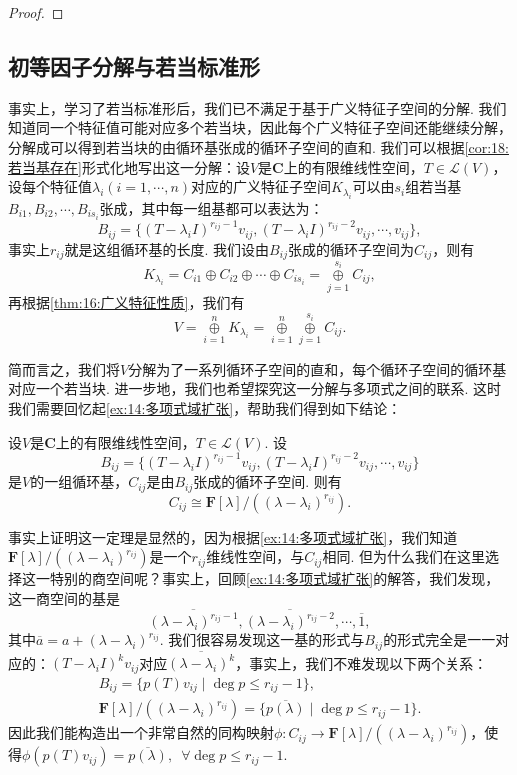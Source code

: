 \begin{proof}

\end{proof}

\subsection{初等因子分解与若当标准形}
事实上，学习了若当标准形后，我们已不满足于基于广义特征子空间的分解. 我们知道同一个特征值可能对应多个若当块，因此每个广义特征子空间还能继续分解，分解成可以得到若当块的由循环基张成的循环子空间的直和. 我们可以根据\autoref{cor:18:若当基存在}形式化地写出这一分解：设$V$是$\mathbf{C}$上的有限维线性空间，$T\in\mathcal{L}(V)$，设每个特征值$\lambda_i(i=1,\cdots,n)$对应的广义特征子空间$K_{\lambda_i}$可以由$s_i$组若当基$B_{i1},B_{i2},\cdots,B_{is_i}$张成，其中每一组基都可以表达为：
\[B_{ij}=\{(T-\lambda_iI)^{r_{ij}-1}v_{ij},(T-\lambda_iI)^{r_{ij}-2}v_{ij},\cdots,v_{ij}\},\]
事实上$r_{ij}$就是这组循环基的长度. 我们设由$B_{ij}$张成的循环子空间为$C_{ij}$，则有
\[K_{\lambda_i}=C_{i1}\oplus C_{i2}\oplus\cdots\oplus C_{is_i}=\mathop{\oplus}\limits_{j=1}^{s_i} C_{ij},\]
再根据\autoref{thm:16:广义特征性质}，我们有
\begin{equation} \label{eq:19:循环子空间分解}
    V=\mathop{\oplus}\limits_{i=1}^n K_{\lambda_i}=\mathop{\oplus}\limits_{i=1}^n\mathop{\oplus}\limits_{j=1}^{s_i} C_{ij}.
\end{equation}

简而言之，我们将$V$分解为了一系列循环子空间的直和，每个循环子空间的循环基对应一个若当块. 进一步地，我们也希望探究这一分解与多项式之间的联系. 这时我们需要回忆起\autoref{ex:14:多项式域扩张}，帮助我们得到如下结论：
\begin{theorem} \label{thm:19:循环子空间同构于商空间}
    设$V$是$\mathbf{C}$上的有限维线性空间，$T\in\mathcal{L}(V)$. 设
    \[B_{ij}=\{(T-\lambda_iI)^{r_{ij}-1}v_{ij},(T-\lambda_iI)^{r_{ij}-2}v_{ij},\cdots,v_{ij}\}\]
    是$V$的一组循环基，$C_{ij}$是由$B_{ij}$张成的循环子空间. 则有
    \[C_{ij}\cong \mathbf{F}[\lambda]/((\lambda-\lambda_i)^{r_{ij}}).\]
\end{theorem}

事实上证明这一定理是显然的，因为根据\autoref{ex:14:多项式域扩张}，我们知道$\mathbf{F}[\lambda]/((\lambda-\lambda_i)^{r_{ij}})$是一个$r_{ij}$维线性空间，与$C_{ij}$相同. 但为什么我们在这里选择这一特别的商空间呢？事实上，回顾\autoref{ex:14:多项式域扩张}的解答，我们发现，这一商空间的基是
\[\overline{(\lambda-\lambda_i)^{r_{ij}-1}},\overline{(\lambda-\lambda_i)^{r_{ij}-2}},\cdots,\overline{1},\]
其中$\overline{a}=a+(\lambda-\lambda_i)^{r_{ij}}$. 我们很容易发现这一基的形式与$B_{ij}$的形式完全是一一对应的：$(T-\lambda_iI)^kv_{ij}$对应$\overline{(\lambda-\lambda_i)^k}$，事实上，我们不难发现以下两个关系：
\begin{gather*}
    B_{ij}=\{p(T)v_{ij}\mid \deg p\leqslant r_{ij}-1\},\\
    \mathbf{F}[\lambda]/((\lambda-\lambda_i)^{r_{ij}})=\{\overline{p(\lambda)}\mid \deg p\leqslant r_{ij}-1\}.
\end{gather*}
因此我们能构造出一个非常自然的同构映射$\phi:C_{ij}\to \mathbf{F}[\lambda]/((\lambda-\lambda_i)^{r_{ij}})$，使得$\phi(p(T)v_{ij})=\overline{p(\lambda)},\enspace\forall \deg p\leqslant r_{ij}-1$.

